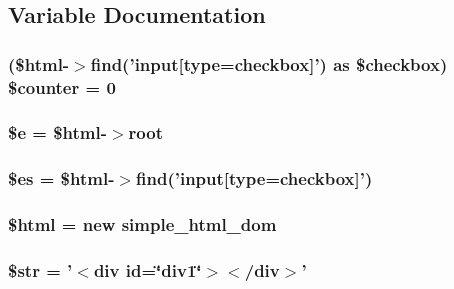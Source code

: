 \subsection{Variable Documentation}
\hypertarget{dom__testcase_8php_af6e35bb61d58e268ba65118e7131d906}{
\subsubsection[{\$counter}]{ (\$html-\/$>$find('input\mbox{[}{\bf type}=checkbox\mbox{]}') as \$checkbox) \$counter = 0}}\label{dom__testcase_8php_af6e35bb61d58e268ba65118e7131d906}
\hypertarget{dom__testcase_8php_ab74076a9b7e1d23d12b9e8d65e60315a}{
\subsubsection[{\$e}]{\setlength{\rightskip}{0pt plus 5cm}\$e = \$html-\/$>$root}}\label{dom__testcase_8php_ab74076a9b7e1d23d12b9e8d65e60315a}
\hypertarget{dom__testcase_8php_a388cbda27103d2baee3997798d1f2744}{
\subsubsection[{\$es}]{\setlength{\rightskip}{0pt plus 5cm}\$es = \$html-\/$>$find('input\mbox{[}{\bf type}=checkbox\mbox{]}')}}\label{dom__testcase_8php_a388cbda27103d2baee3997798d1f2744}
\hypertarget{dom__testcase_8php_a6f96e7fc92441776c9d1cd3386663b40}{
\subsubsection[{\$html}]{\setlength{\rightskip}{0pt plus 5cm}\$html = new {\bf simple\+\_\+html\+\_\+dom}}}\label{dom__testcase_8php_a6f96e7fc92441776c9d1cd3386663b40}
\hypertarget{dom__testcase_8php_a7542d95618011800c61773127fa625cf}{
\subsubsection[{\$str}]{\setlength{\rightskip}{0pt plus 5cm}\$str = '$<$div {\bf id}=\char`\"{}div1\char`\"{}$>$$<$/div$>$'}}\label{dom__testcase_8php_a7542d95618011800c61773127fa625cf}
